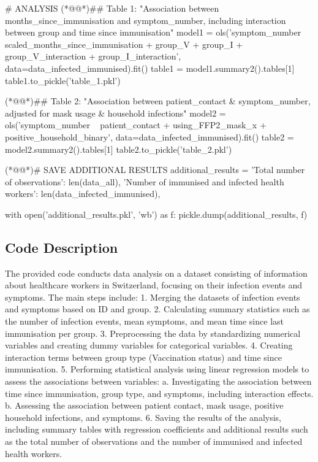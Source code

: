 \documentclass[11pt]{article}
\begin{document}
\begin{python}
# ANALYSIS
(*@@*)## Table 1: "Association between months_since_immunisation and symptom_number, including interaction between group and time since immunisation"
model1 = ols('symptom_number ~ scaled_months_since_immunisation + group_V + group_I + group_V_interaction + group_I_interaction', 
             data=data_infected_immunised).fit()
table1 = model1.summary2().tables[1]
table1.to_pickle('table_1.pkl')

(*@@*)## Table 2: "Association between patient_contact & symptom_number, adjusted for mask usage & household infections"
model2 = ols('symptom_number ~ patient_contact + using_FFP2_mask_x + positive_household_binary', 
             data=data_infected_immunised).fit()
table2 = model2.summary2().tables[1]
table2.to_pickle('table_2.pkl')

(*@@*)# SAVE ADDITIONAL RESULTS
additional_results = {
    'Total number of observations': len(data_all),
    'Number of immunised and infected health workers': len(data_infected_immunised),
}

with open('additional_results.pkl', 'wb') as f:
    pickle.dump(additional_results, f)

\end{python}

\subsection{Code Description}

The provided code conducts data analysis on a dataset consisting of information about healthcare workers in Switzerland, focusing on their infection events and symptoms. The main steps include:
1. Merging the datasets of infection events and symptoms based on ID and group.
2. Calculating summary statistics such as the number of infection events, mean symptoms, and mean time since last immunisation per group.
3. Preprocessing the data by standardizing numerical variables and creating dummy variables for categorical variables.
4. Creating interaction terms between group type (Vaccination status) and time since immunisation.
5. Performing statistical analysis using linear regression models to assess the associations between variables:
   a. Investigating the association between time since immunisation, group type, and symptoms, including interaction effects.
   b. Assessing the association between patient contact, mask usage, positive household infections, and symptoms.
6. Saving the results of the analysis, including summary tables with regression coefficients and additional results such as the total number of observations and the number of immunised and infected health workers.
\end{document}
